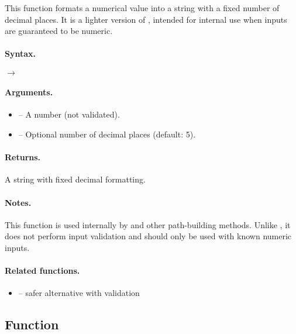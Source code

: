 This function formats a numerical value into a string with a fixed number of decimal places. It is a lighter version of , intended for internal use when inputs are guaranteed to be numeric.

\paragraph{Syntax.}
\begin{center}
 \hfill $\rightarrow$ 
\end{center}

\paragraph{Arguments.}
\begin{itemize}
\item {} – A number (not validated).
\item {} – Optional number of decimal places (default: 5).
\end{itemize}

\paragraph{Returns.}
A string with fixed decimal formatting.

\paragraph{Notes.}
This function is used internally by  and other path-building methods. Unlike , it does not perform input validation and should only be used with known numeric inputs.

\paragraph{Related functions.}
\begin{itemize}
\item {} – safer alternative with validation
\end{itemize}



\subsection{Function } %
\label{sub:function_utils_checknumber}

